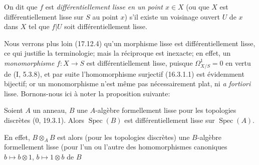 On dit que $f$ est \emph{différentiellement lisse en un point $x\in X$} (ou
que $X$ est différentiellement lisse sur $S$ au point $x$) s'il existe un
voisinage ouvert $U$ de $x$ dans $X$ tel que $f|U$ soit différentiellement
lisse.

Nous verrons plus loin (17.12.4) qu'un morphisme lisse est différentiellement
lisse, ce qui justifie la terminologie; mais la réciproque est inexacte; en
effet, un \emph{monomorphisme} $f:X\to S$ est différentiellement lisse,
puisque $\Omega_{X/S}^1=0$ en vertu de (I, 5.3.8), et par suite
l'homomorphisme surjectif (16.3.1.1) est évidemment bijectif; or un
monomorphisme n'est même pas nécessairement plat, ni \emph{a fortiori} lisse.
Bornons-nous ici à noter la proposition suivante:

\begin{proposition}[16.10.2]
\label{IV.16.10.2}
Soient $A$ un anneau, $B$ une $A$-algèbre formellement lisse pour les
topologies discrètes (0, 19.3.1). Alors $\operatorname{Spec}(B)$ est
différentiellement lisse sur $\operatorname{Spec}(A)$.
\end{proposition}

En effet, $B\otimes_A B$ est alors (pour les topologies discrètes) une
$B$-algèbre formellement lisse (pour l'un ou l'autre des homomorphismes
canoniques $b\mapsto b\otimes1$, $b\mapsto1\otimes b$ de $B$
